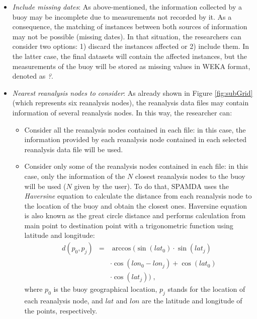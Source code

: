 \documentclass[energies,article,submit,moreauthors,pdftex]{Definitions/mdpi}
\begin{document}
\begin{itemize}[leftmargin=*,labelsep=5.8mm]
					\item \textit{Include missing dates}: As above-mentioned, the information collected by a buoy may be incomplete due to measurements not recorded by it. As a consequence, the matching of instances between both sources of information may not be possible (missing dates). In that situation, the researchers can consider two options: 1) discard the instances affected or 2) include them. In the latter case, the final datasets will contain the affected instances, but the measurements of the buoy will be stored as missing values in WEKA format, denoted as \guillemotleft\textit{?}\guillemotright.
					
					\item \textit{Nearest reanalysis nodes to consider}: As already shown in Figure \ref{fig:subGrid} (which represents six reanalysis nodes), the reanalysis data files may contain information of several reanalysis nodes. In this way, the researcher can:
					
						\begin{itemize}[leftmargin=*,labelsep=5.8mm]
							
							\item Consider all the reanalysis nodes contained in each file: in this case, the information provided by each reanalysis node contained in each selected reanalysis data file will be used.
							
							\item Consider only some of the reanalysis nodes contained in each file: in this case, only the information of the $N$ closest reanalysis nodes to the buoy will be used  ($N$ given by the user). To do that, SPAMDA uses the \textit{Haversine} equation \cite{Haversine_2009} to calculate the distance from each reanalysis node to the location of the buoy and obtain the closest ones. Haversine equation is also known as the great circle distance and performs calculation from main point to destination point with a trigonometric function using latitude and longitude:
								\begin{eqnarray}
									\label{eq:Haversine}
									d(p_0,p_j) & = & \arccos(\sin(lat_0)\cdot \sin(lat_j) \nonumber \\
									& & \cdot \cos(lon_0-lon_j) + \cos(lat_0) \\
									& & \cdot \cos(lat_j))\;, \nonumber 
								\end{eqnarray}								
							where $p_0$ is the buoy geographical location, $p_j$ stands for the location of each reanalysis node, and $lat$ and $lon$ are the latitude and longitude of the points, respectively.
						\end{itemize}
					

\end{itemize}
\end{document}
